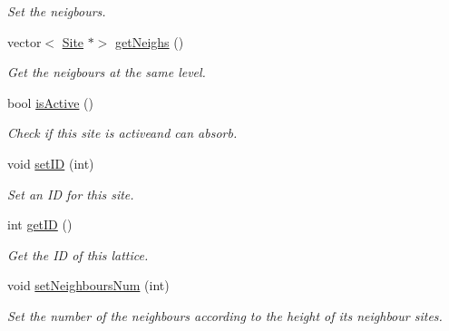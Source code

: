 \begin{DoxyCompactItemize}
\begin{DoxyCompactList}\small\item\em Set the neigbours. \end{DoxyCompactList}\item 
\mbox{\label{classSurfaceTiles_1_1Site_ac49f8c56b30c5004956c1bd45eaf11aa}} 
vector$<$ \mbox{\hyperlink{classSurfaceTiles_1_1Site}{Site}} $\ast$$>$ \mbox{\hyperlink{classSurfaceTiles_1_1Site_ac49f8c56b30c5004956c1bd45eaf11aa}{get\+Neighs}} ()
\begin{DoxyCompactList}\small\item\em Get the neigbours at the same level. \end{DoxyCompactList}\item 
\mbox{\label{classSurfaceTiles_1_1Site_afe47afd580fb276eacdd1568225b9bb4}} 
bool \mbox{\hyperlink{classSurfaceTiles_1_1Site_afe47afd580fb276eacdd1568225b9bb4}{is\+Active}} ()
\begin{DoxyCompactList}\small\item\em Check if this site is activeand can absorb. \end{DoxyCompactList}\item 
\mbox{\label{classSurfaceTiles_1_1Site_a17329cf7bbcf67e4fd9c23ffeb64727a}} 
void \mbox{\hyperlink{classSurfaceTiles_1_1Site_a17329cf7bbcf67e4fd9c23ffeb64727a}{set\+ID}} (int)
\begin{DoxyCompactList}\small\item\em Set an ID for this site. \end{DoxyCompactList}\item 
\mbox{\label{classSurfaceTiles_1_1Site_aae86a90ab48c1b62d56a419b04034f53}} 
int \mbox{\hyperlink{classSurfaceTiles_1_1Site_aae86a90ab48c1b62d56a419b04034f53}{get\+ID}} ()
\begin{DoxyCompactList}\small\item\em Get the ID of this lattice. \end{DoxyCompactList}\item 
\mbox{\label{classSurfaceTiles_1_1Site_a2b84655bd4098d321f37a008cd638c2d}} 
void \mbox{\hyperlink{classSurfaceTiles_1_1Site_a2b84655bd4098d321f37a008cd638c2d}{set\+Neighbours\+Num}} (int)
\begin{DoxyCompactList}\small\item\em Set the number of the neighbours according to the height of its neighbour sites. \end{DoxyCompactList}\item 
$$
\end{DoxyCompactItemize}
